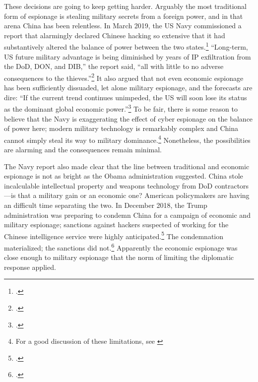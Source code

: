\documentclass{memoir}
\begin{document}
\begin{refsegment}
These decisions are going to keep getting harder. Arguably the most traditional form of espionage is stealing military secrets from a foreign power, and in that arena China has been relentless. In March 2019, the US Navy commissioned a report that alarmingly declared Chinese hacking so extensive that it had substantively altered the balance of power between the two states.\footcite{lubold_navy_2019} ``Long-term, US future military advantage is being diminished by years of IP exfiltration from the DoD, DON, and DIB,'' the report said, ``all with little to no adverse consequences to the thieves.''\footcite[p.~6]{bayer_cybersecurity_2019} It also argued that not even economic espionage has been sufficiently dissuaded, let alone military espionage, and the forecasts are dire: ``If the current trend continues unimpeded, the US will soon lose its status as the dominant global economic power.''\footcite[p.~5]{bayer_cybersecurity_2019} To be fair, there is some reason to believe that the Navy is exaggerating the effect of cyber espionage on the balance of power here; modern military technology is remarkably complex and China cannot simply steal its way to military dominance.\footnote{For a good discussion of these limitations, see \cite{gilli_why_2019}} Nonetheless, the possibilities are alarming and the consequences remain minimal.

The Navy report also made clear that the line between traditional and economic espionage is not as bright as the Obama administration suggested. China stole incalculable intellectual property and weapons technology from DoD contractors---is that a military gain or an economic one? American policymakers are having an difficult time separating the two. In December 2018, the Trump administration was preparing to condemn China for a campaign of economic and military espionage; sanctions against hackers suspected of working for the Chinese intelligence service were highly anticipated.\footcite{nakashima_trump_2018-1} The condemnation materialized; the sanctions did not.\footcite{barfield_new_2019} Apparently the economic espionage was close enough to military espionage that the norm of limiting the diplomatic response applied.


\end{refsegment}
\end{document}
